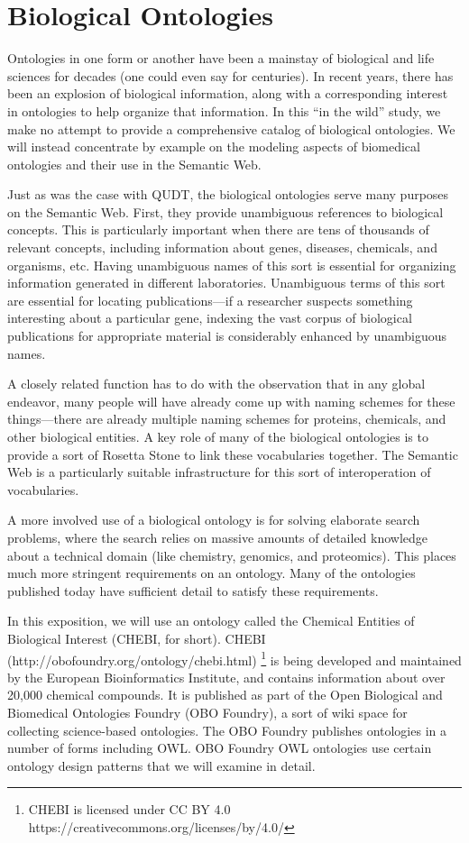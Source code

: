 \section{Biological Ontologies}
\label{section:Bio}

Ontologies in one form or another have been a mainstay of biological and
life sciences for decades (one could even say for centuries). In recent
years, there has been an explosion of biological information, along with
a corresponding interest in ontologies to help organize that
information. In this ``in the wild'' study, we make no attempt to
provide a comprehensive catalog of biological ontologies. We will
instead concentrate by example on the modeling aspects of biomedical
ontologies and their use in the Semantic Web.

Just as was the case with QUDT, the biological ontologies serve many
purposes on the Semantic Web. First, they provide unambiguous references
to biological concepts. This is particularly important when there are
tens of thousands of relevant concepts, including information about
genes, diseases, chemicals, and organisms, etc. Having unambiguous names
of this sort is essential for organizing information generated in
different laboratories. Unambiguous terms of this sort are essential for
locating publications---if a researcher suspects something interesting
about a particular gene, indexing the vast corpus of biological
publications for appropriate material is considerably enhanced by
unambiguous names.

A closely related function has to do with the observation that in any
global endeavor, many people will have already come up with naming
schemes for these things---there are already multiple naming schemes for
proteins, chemicals, and other biological entities. A key role of many
of the biological ontologies is to provide a sort of Rosetta Stone to
link these vocabularies together. The Semantic Web is a particularly
suitable infrastructure for this sort of interoperation of vocabularies.

A more involved use of a biological ontology is for solving elaborate
search problems, where the search relies on massive amounts of detailed
knowledge about a technical domain (like chemistry, genomics, and
proteomics). This places much more stringent requirements on an
ontology. Many of the ontologies published today have sufficient detail
to satisfy these requirements.

In this exposition, we will use an ontology called the Chemical Entities
of Biological Interest (CHEBI, for short). CHEBI (http://obofoundry.org/ontology/chebi.html) \footnote{CHEBI is licensed under CC BY 4.0 https://creativecommons.org/licenses/by/4.0/} is being developed and
maintained by the European Bioinformatics Institute, and contains
information about over 20,000 chemical compounds. It is published as
part of the Open Biological and Biomedical Ontologies Foundry (OBO
Foundry), a sort of wiki space for collecting science-based ontologies.
The OBO Foundry publishes ontologies in a number of forms including OWL.
OBO Foundry OWL ontologies use certain ontology design patterns that we
will examine in detail.


